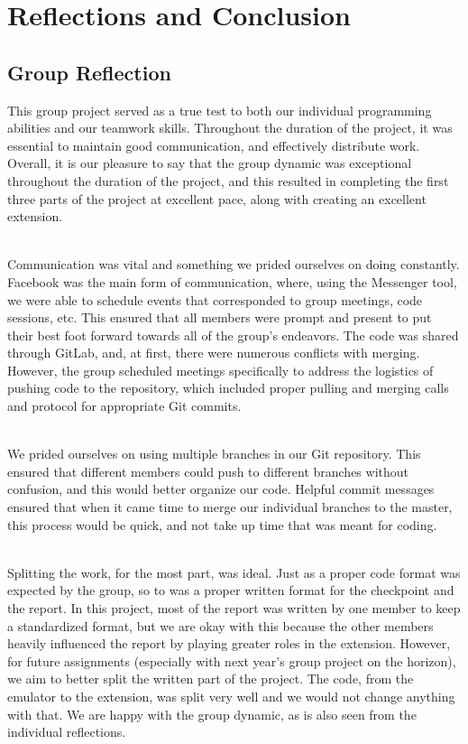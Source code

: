 \documentclass[11pt]{article}
\begin{document}
\section{Reflections and Conclusion}

\subsection{Group Reflection}

This group project served as a true test to both our individual programming abilities and our teamwork skills. Throughout the duration of the project, it was essential to maintain good communication, and effectively distribute work. Overall, it is our pleasure to say that the group dynamic was exceptional throughout the duration of the project, and this resulted in completing the first three parts of the project at excellent pace, along with creating an excellent extension. 

\\Communication was vital and something we prided ourselves on doing constantly. Facebook was the main form of communication, where, using the Messenger tool, we were able to schedule events that corresponded to group meetings, code sessions, etc. This ensured that all members were prompt and present to put their best foot forward towards all of the group's endeavors. The code was shared through GitLab, and, at first, there were numerous conflicts with merging. However, the group scheduled meetings specifically to address the logistics of pushing code to the repository, which included proper pulling and merging calls and protocol for appropriate Git commits.

\\We prided ourselves on using multiple branches in our Git repository. This ensured that different members could push to different branches without confusion, and this would better organize our code. Helpful commit messages ensured that when it came time to merge our individual branches to the master, this process would be quick, and not take up time that was meant for coding.

\\Splitting the work, for the most part, was ideal. Just as a proper code format was expected by the group, so to was a proper written format for the checkpoint and the report. In this project, most of the report was written by one member to keep a standardized format, but we are okay with this because the other members heavily influenced the report by playing greater roles in the extension. However, for future assignments (especially with next year's group project on the horizon), we aim to better split the written part of the project. The code, from the emulator to the extension, was split very well and we would not change anything with that. We are happy with the group dynamic, as is also seen from the individual reflections.
\end{document}

